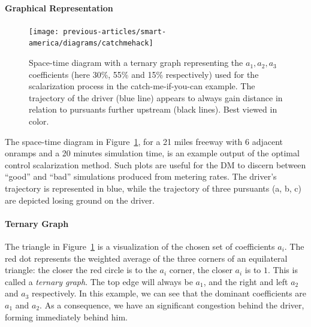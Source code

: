 \paragraph{Graphical Representation}
\begin{figure}[t]
\centering
  \texttt{[image: previous-articles/smart-america/diagrams/catchmehack]}
\caption{Space-time diagram with a ternary graph representing the $a_1,a_2,a_3$ coefficients (here 30\%, 55\% and 15\% respectively) used for the scalarization process in the catch-me-if-you-can example.  The trajectory of the driver (blue line) appears to always gain distance in relation to pursuants further upstream (black lines). Best viewed in color.}
\label{fig:catchmeOverview}
\end{figure}
The space-time diagram in Figure~\ref{fig:catchmeOverview}, for a 21 miles freeway with $6$ adjacent onramps and a 20 minutes simulation time, is an example output of the optimal control scalarization method. Such plots are useful for the DM to discern between ``good'' and ``bad'' simulations produced from metering rates.  The driver's trajectory is represented in blue, while the trajectory of three pursuants (a, b, c) are depicted losing ground on the driver.
\paragraph{Ternary Graph}
The triangle in Figure~\ref{fig:catchmeOverview} is a visualization of the chosen set of coefficients $a_i$. The red dot represents the weighted average of the three corners of an equilateral triangle: the closer the red circle is to the $a_i$ corner, the closer $a_i$ is to $1$. This is called a \emph{ternary graph}. The top edge will always be $a_1$, and the right and left $a_2$ and $a_3$ respectively. In this example, we can see that the dominant coefficients are $a_1$ and $a_2$. As a consequence, we have an significant congestion behind the driver, forming immediately behind him.
